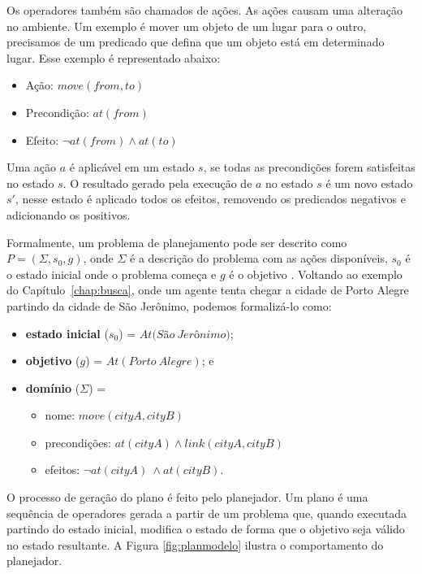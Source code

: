 Os operadores também são chamados de ações. 
As ações causam uma alteração no ambiente. Um exemplo é mover um objeto de um lugar para o outro, precisamos de um predicado que defina que um objeto está em determinado lugar. Esse exemplo é representado abaixo:



\begin{itemize}
	\item Ação: $move(from, to)$
	\item Precondição: $at(from)$
	\item Efeito: $\neg at(from) \wedge at(to)$
\end{itemize}

Uma ação $a$ é aplicável em um estado $s$, se todas as precondições forem satisfeitas no estado $s$. 
O resultado gerado pela execução de $a$ no estado $s$ é um novo estado $s'$, nesse estado é aplicado todos os efeitos, removendo os predicados negativos e adicionando os positivos.

Formalmente, um problema de planejamento pode ser descrito como $P = (\Sigma, s_{0}, g)$, onde $\Sigma$ é a descrição do problema com as ações disponíveis, $s_{0}$ é o estado inicial onde o problema começa e $g$ é o objetivo \cite{ghallab2004automated}. 
Voltando ao exemplo do Capítulo~\ref{chap:busca}, onde um agente tenta chegar a cidade de Porto Alegre partindo da cidade de São Jerônimo, podemos formalizá-lo como:

\begin{itemize}
	\item \textbf{estado inicial} ($s_{0}$) = $At(S$\~a$o~Jer$\^o$nimo)$;
	\item \textbf{objetivo} ($g$) = $At(Porto~Alegre)$; e
	\item \textbf{domínio} ($\Sigma$) = 
	\begin{itemize}
		\item nome: $move(cityA, cityB)$
		\item precondições: $at(cityA) \wedge link(cityA, cityB)$
		\item efeitos: $\neg at(cityA)~ \wedge at(cityB)$.
	\end{itemize}
\end{itemize}


O processo de geração do plano é feito pelo planejador. 
Um plano é uma sequência de operadores gerada a partir de um problema que, quando executada partindo do estado inicial, modifica o estado de forma que o objetivo seja válido no estado resultante. 
A Figura \ref{fig:planmodelo} ilustra o comportamento do planejador.

